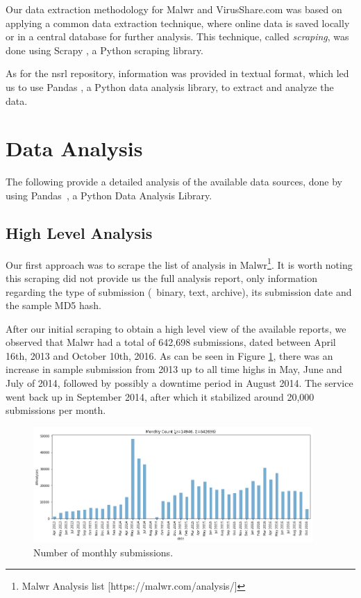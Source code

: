 Our data extraction methodology for Malwr and VirusShare.com was based on applying a common data extraction technique, where online data is saved locally or in a central database for further analysis. This technique, called \textit{scraping}, was done using Scrapy \cite{tool:scrapy}, a Python scraping library.

As for the \gls{nsrl} repository, information was provided in textual format, which led us to use Pandas \cite{tool:pandas}, a Python data analysis library, to extract and analyze the data.


\section{Data Analysis}
\label{section:data_analysis}

The following provide a detailed analysis of the available data sources, done by using Pandas~\cite{tool:pandas}, a Python Data Analysis Library.

\subsection{High Level Analysis}
\label{subsection:high_level_analysis}

Our first approach was to scrape the list of analysis in Malwr\footnote{Malwr Analysis list [https://malwr.com/analysis/]}.
It is worth noting this scraping did not provide us the full analysis report, only information regarding the type of submission (\eg\ binary, text, archive), its submission date and the sample MD5 hash.

After our initial scraping to obtain a high level view of the available reports, we observed that Malwr had a total of 642,698 submissions, dated between April 16th, 2013 and October 10th, 2016. As can be seen in Figure \ref{fig:samples_count}, there was an increase in sample submission from 2013 up to all time highs in May, June and July of 2014, followed by possibly a downtime period in August 2014.
The service went back up in September 2014, after which it stabilized around 20,000 submissions per month.

\begin{figure}[!htb]
	\centering
	\includegraphics[width=0.95\textwidth]{Figures/samples_count.png}
	\caption[Number of monthly submissions.]{Number of monthly submissions.}
	\label{fig:samples_count}
\end{figure}

